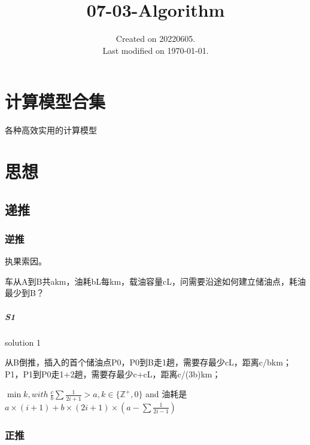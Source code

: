 \documentclass[UTF8]{../computerUniverse}
\begin{document}
\title{07-03-Algorithm}
\date{Created on 20220605.\\   Last modified on \today.}
\maketitle
\tableofcontents








\chapter{计算模型合集}
各种高效实用的计算模型







\chapter{思想}

\section{递推}

\subsection{逆推}
执果索因。


\begin{question}
 车从A到B共akm，油耗bL每km，载油容量cL，问需要沿途如何建立储油点，耗油最少到B？

  \paragraph{S1} solution 1

  从B倒推，插入的首个储油点P0，P0到B走1趟，需要存最少cL，距离c/bkm；
  P1，P1到P0走1+2趟，需要存最少c+cL，距离c/(3b)km；



  $\min k, with \ \frac{c}{b}\sum\frac{1}{2i+1} > a, k\in \{ \mathbb{Z} ^+, 0\}$ and 油耗是$a \times (i+1) + b \times(2i+1) \times (a - \sum\frac{1}{2i-1})$

\end{question}

\subsection{正推}
\end{document}
